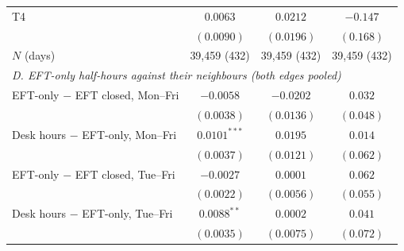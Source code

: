 \begin{tabular}{lccc}
T4 & $0.0063$ & $0.0212$ & $-0.147$ \\
 & $(0.0090)$ & $(0.0196)$ & $(0.168)$ \\
$N$ (days) & 39,459 (432) & 39,459 (432) & 39,459 (432) \\
\midrule
\multicolumn{4}{l}{\emph{D. EFT-only half-hours against their neighbours (both edges pooled)}} \\
EFT-only $-$ EFT closed, Mon--Fri & $-0.0058$ & $-0.0202$ & $0.032$ \\
 & $(0.0038)$ & $(0.0136)$ & $(0.048)$ \\
Desk hours $-$ EFT-only, Mon--Fri & $0.0101^{***}$ & $0.0195$ & $0.014$ \\
 & $(0.0037)$ & $(0.0121)$ & $(0.062)$ \\
EFT-only $-$ EFT closed, Tue--Fri & $-0.0027$ & $0.0001$ & $0.062$ \\
 & $(0.0022)$ & $(0.0056)$ & $(0.055)$ \\
Desk hours $-$ EFT-only, Tue--Fri & $0.0088^{**}$ & $0.0002$ & $0.041$ \\
 & $(0.0035)$ & $(0.0075)$ & $(0.072)$ \\
\bottomrule
\end{tabular}
